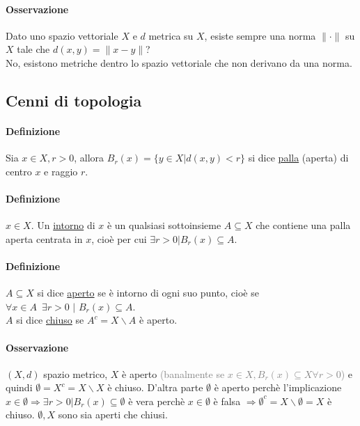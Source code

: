\documentclass{article}
\begin{document}
\paragraph{Osservazione}
Dato uno spazio vettoriale $X$ e $d$ metrica su $X$, esiste sempre una norma $\|\cdot\|$ su $X$ tale che $d(x,y)=\| x-y\|$?\\
No, esistono metriche dentro lo spazio vettoriale che non derivano da una norma.

\subsection{{Cenni di topologia}}
\paragraph{Definizione}
Sia $x\in X, r >0$, allora $B_r(x)=\{ y\in X|d(x,y) < r \}$ si dice \underline{palla} (aperta) di centro $x$ e raggio $r$.

\paragraph{{Definizione}}
$x\in X$. Un \underline{intorno} di $x$ è un qualsiasi sottoinsieme $A \subseteq X$ che contiene una palla aperta centrata in $x$, cioè per cui $\exists r >0 | B_r(x)\subseteq A.$

\paragraph{{Definizione}}
$A \subseteq X$ si dice \underline{aperto} se è intorno di ogni suo punto, cioè se $\forall x \in A\,\,\, \exists r>0\,\,|\,\, B_r(x)\subseteq A$.\\
$A$ si dice \underline{chiuso} se $A^c = X \backslash A$ è aperto.

\paragraph{{Osservazione}}
$(X,d)$ spazio metrico, $X$ è aperto \textcolor{grey}{(banalmente se $x\in X, B_r(x) \subseteq X \forall r>0$)} e quindi $\emptyset = X^c = X \backslash X$ è chiuso. D'altra parte $\emptyset $ è aperto perchè l'implicazione $x \in \emptyset \Rightarrow \exists r >0 | B_r(x) \subseteq \emptyset$ è vera perchè $x \in \emptyset$  è falsa $\Rightarrow \emptyset^c=X \backslash \emptyset = X$ è chiuso. $\emptyset, X$ sono sia aperti che chiusi.
\end{document}
